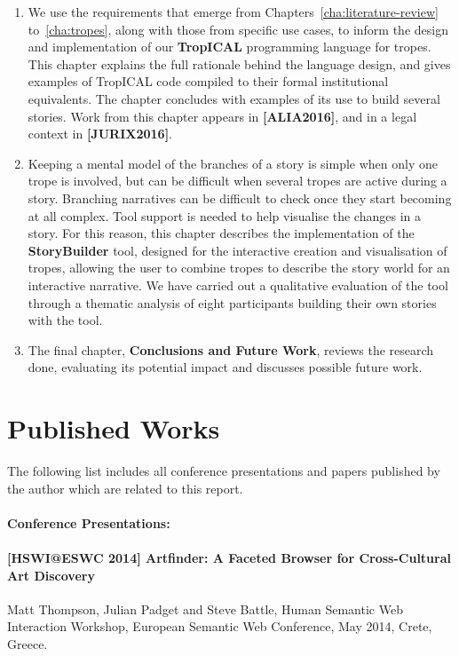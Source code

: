 \documentclass[11pt]{report}
\begin{document}
\begin{enumerate}[{Chapter} 1:]
\item We use the requirements that emerge from Chapters~\ref{cha:literature-review}
  to~\ref{cha:tropes}, along with those from specific use cases, to inform the design and implementation of our \textbf{TropICAL} programming
  language for tropes. This chapter explains the full rationale behind the
  language design, and gives examples of TropICAL code compiled to their formal
  institutional equivalents. The chapter concludes with examples of its use to build several stories.
  Work from this chapter appears in \textbf{[ALIA2016]}, and in a legal
  context in \textbf{[JURIX2016]}.
\item
  Keeping a mental model of the branches of a story is simple when only one
  trope is involved, but can be difficult when several tropes are active during a story.
  Branching narratives can be difficult to check once they start becoming at all
  complex. Tool support is needed to help visualise the changes in a
  story. For
  this reason, this chapter describes the implementation of the \textbf{StoryBuilder} tool,
  designed for the interactive creation and visualisation of tropes, allowing
  the user to combine tropes to describe the story world for an interactive
  narrative. We have carried out a qualitative evaluation of the tool
  through a thematic analysis of eight participants building their own stories
  with the tool.
\item The final chapter, \textbf{Conclusions and Future Work}, reviews the
  research done, evaluating its potential impact and discusses possible future work.
\end{enumerate}


\section{Published Works}
\label{sec:papers}

  The following list includes all conference presentations and papers published by the author which are related to this report.

  \paragraph{Conference Presentations:}
  \paragraph{[HSWI@ESWC 2014] Artfinder: A Faceted Browser for Cross-Cultural Art Discovery} Matt Thompson, Julian Padget and Steve Battle, Human Semantic Web Interaction Workshop, European Semantic Web Conference, May 2014, Crete, Greece.\label{pub:hswi}
\end{document}
